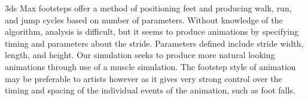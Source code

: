 3ds Max footsteps offer a method of positioning feet and producing walk, run, and jump cycles based on  number of parameters.  Without knowledge of the algorithm, analysis is difficult, but it seems to produce animations by specifying timing and parameters about the stride.  Parameters defined include stride width, length, and height.  Our simulation seeks to produce more natural looking animations through use of a muscle simulation.  The footstep style of animation may be preferable to artists however as it gives very strong control over the timing and spacing of the individual events of the animation, such as foot falls.